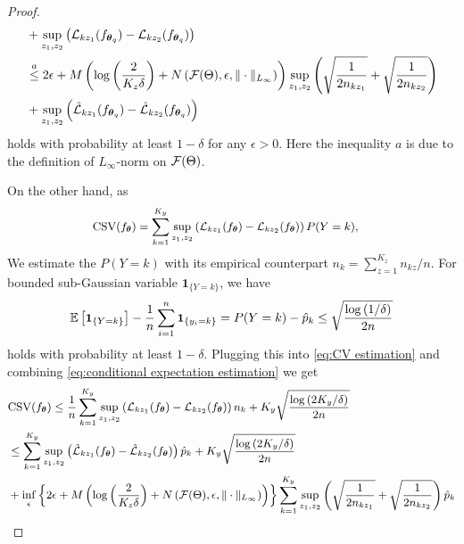 \begin{proof}
\begin{equation}
\begin{aligned}
			& + \sup_{z_{1}, z_{2}}\left(\mathcal{L}_{kz_{1}}(f_{\text{\boldmath{$\theta$}}_{q}}) - \mathcal{L}_{kz_{2}}(f_{\text{\boldmath{$\theta$}}_{q}})\right) \\
			& \overset{a}{\leq} 2\epsilon + M\left(\log{\left(\frac{2}{K_{z}\delta}\right)} + N\left(\mathcal{F}(\Theta), \epsilon, \|\cdot\|_{L_{\infty}}\right)\right)\sup_{z_{1}, z_{2}}\left(\sqrt{\frac{1}{2n_{kz_{1}}}} + \sqrt{\frac{1}{2n_{kz_{2}}}}\right)\\ & + \sup_{z_{1},z_{2}}\left(\hat{\mathcal{L}}_{kz_{1}}(f_{\text{\boldmath{$\theta$}}_{q}}) - \hat{\mathcal{L}}_{kz_{2}}(f_{\text{\boldmath{$\theta$}}_{q}})\right)
		\end{aligned}
	\end{equation}
	holds with probability at least $1 - \delta$ for any $\epsilon > 0$. Here the inequality $a$ is due to the definition of $L_{\infty}$-norm on $\mathcal{F}(\Theta)$.  
	\par
	On the other hand, as 
	\begin{equation}\label{eq:CV estimation}
		\small
		\begin{aligned}
			\mathrm{CSV}(f_{\btheta}) & = \sum\limits_{k = 1}^{K_{y}}\sup_{z_{1}, z_{2}}\left(\cL_{kz_{1}}(f_{\btheta}) - \cL_{kz_{2}}(f_{\btheta})\right)P(Y = k), 
		\end{aligned}
	\end{equation}
	We estimate the  $P(Y = k)$ with its empirical counterpart $n_{k} = \sum_{z=1}^{K_{z}}n_{kz} / n$. For bounded sub-Gaussian variable $\textbf{1}_{\{Y = k\}}$, we have   
	\begin{equation}
		\small
		\mE\left[\textbf{1}_{\{Y=k\}}\right] - \frac{1}{n}\sum\limits_{i=1}^{n}\textbf{1}_{\{y_{i}=k\}} = P(Y = k) - \hat{p}_{k} \leq \sqrt{\frac{\log{(1/\delta)}}{2n}}
	\end{equation}
	holds with probability at least $1 - \delta$. Plugging this into \eqref{eq:CV estimation} and combining \eqref{eq:conditional expectation estimation} we get 
	\begin{equation}\label{eq:CSV bound}
		\small
		\begin{aligned}
			& \mathrm{CSV}(f_{\btheta}) \leq \frac{1}{n}\sum\limits_{k = 1}^{K_{y}}\sup_{z_{1}, z_{2}}\left(\cL_{kz_{1}}(f_{\btheta}) - \cL_{kz_{2}}(f_{\btheta})\right)n_{k} + K_{y}\sqrt{\frac{\log{(2K_{y}/\delta)}}{2n}} \\
			& \leq \sum\limits_{k = 1}^{K_{y}}\sup_{z_{1}, z_{2}}\left(\hat{\cL}_{kz_{1}}(f_{\btheta}) - \hat{\cL}_{kz_{2}}(f_{\btheta})\right)\hat{p}_{k} + K_{y}\sqrt{\frac{\log{(2K_{y}/\delta)}}{2n}} \\
			& + \inf_{\epsilon}\left\{2\epsilon + M\left(\log{\left(\frac{2}{K_{z}\delta}\right)} + N\left(\cF(\Theta), \epsilon, \|\cdot\|_{L_{\infty}}\right)\right)\right\}\sum\limits_{k = 1}^{K_{y}}\sup_{z_{1},z_{2}}\left(\sqrt{\frac{1}{2n_{kz_{1}}}} + \sqrt{\frac{1}{2n_{kz_{2}}}}\right)\hat{p}_{k}

\end{aligned}
\end{equation}
\end{proof}
